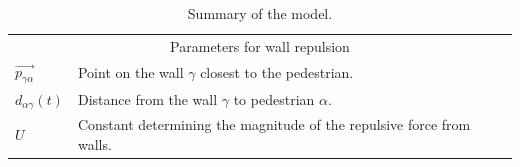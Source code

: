 \begin{table}[h]
\begin{tabular}{l l}
        \midrule
        \multicolumn{2}{c}{\textsf{Parameters for wall repulsion}}\\
        $\overrightarrow{p_{\gamma \alpha}}$ & Point on the wall $\gamma$ closest to
        the pedestrian.\\
        $d_{\alpha \gamma}(t)$ & Distance from the wall $\gamma$ to pedestrian
        $\alpha$. \\
        $U$ & Constant determining the magnitude of the repulsive force from
        walls. \\
        \bottomrule
    \end{tabular}
    \caption{Summary of the model.}
    \label{tbl:model-summary}
\end{table}


